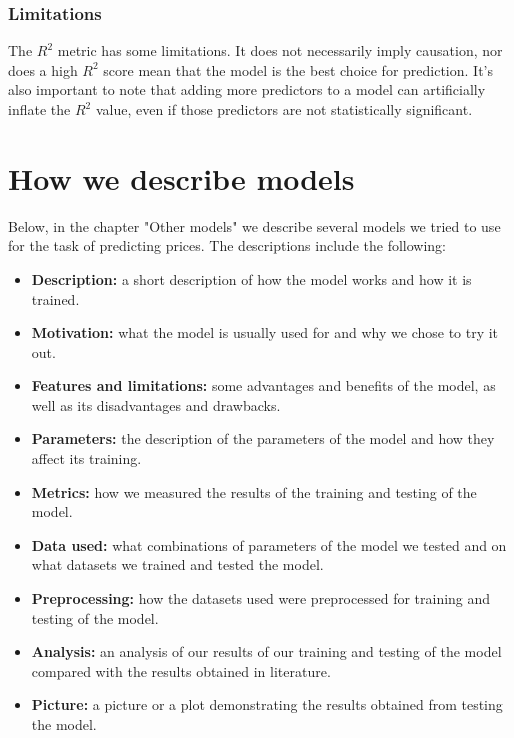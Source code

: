 \subsubsection{Limitations}
The \(R^2\) metric has some limitations. It does not necessarily imply causation, nor does a high \(R^2\) score mean that the model is the best choice for prediction. It's also important to note that adding more predictors to a model can artificially inflate the \(R^2\) value, even if those predictors are not statistically significant.


\section{How we describe models}
Below, in the chapter "Other models" we describe several models we tried to use for the task of predicting prices. The descriptions include the following:
\begin{itemize}
	\item \textbf{Description:} a short description of how the model works and how it is trained.
	\item \textbf{Motivation:} what the model is usually used for and why we chose to try it out.
	\item \textbf{Features and limitations:} some advantages and benefits of the model, as well as its disadvantages and drawbacks.
	\item \textbf{Parameters:} the description of the parameters of the model and how they affect its training.
	\item \textbf{Metrics:} how we measured the results of the training and testing of the model.
	\item \textbf{Data used:} what combinations of parameters of the model we tested and on what datasets we trained and tested the model.
	\item \textbf{Preprocessing:} how the datasets used were preprocessed for training and testing of the model.
	\item \textbf{Analysis:} an analysis of our results of our training and testing of the model compared with the results obtained in literature.
	\item \textbf{Picture:} a picture or a plot demonstrating the results obtained from testing the model.
\end{itemize}

